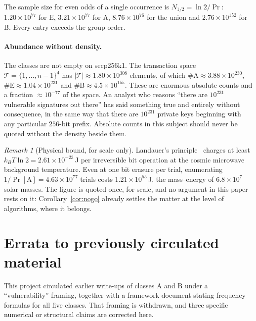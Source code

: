\documentclass[11pt,a4paper]{article}
\theoremstyle{plain}
\theoremstyle{definition}
\theoremstyle{remark}
\newtheorem{remark}[theorem]{Remark}
\newcommand{\Pro}{\Pr}
\newcommand{\clA}{\mathrm{A}}
\newcommand{\clB}{\mathrm{B}}
\newcommand{\clE}{\mathrm{E}}
\begin{document}
The sample size for even odds of a single occurrence is $N_{1/2} = \ln 2/\Pro$: $1.20\times10^{77}$
for $\clE$, $3.21\times10^{77}$ for $\clA$, $8.76\times10^{76}$ for the union and
$2.76\times10^{152}$ for $\clB$. Every entry exceeds the group order.

\paragraph{Abundance without density.}
The classes are not empty on secp256k1. The transaction space
$\mathcal{T} = \{1,\dots,n-1\}^{4}$ has $|\mathcal{T}| \approx 1.80\times10^{308}$ elements, of
which $\#\clA \approx 3.88\times10^{230}$, $\#\clE \approx 1.04\times10^{231}$ and
$\#\clB \approx 4.5\times10^{155}$. These are enormous absolute counts and a fraction
$\approx 10^{-77}$ of the space. An analyst who reasons ``there are $10^{231}$ vulnerable
signatures out there'' has said something true and entirely without consequence, in the same way
that there are $10^{231}$ private keys beginning with any particular $256$-bit prefix. Absolute
counts in this subject should never be quoted without the density beside them.

\begin{remark}[Physical bound, for scale only]
Landauer's principle~\cite{landauer1961} charges at least $k_BT\ln 2 = 2.61\times10^{-23}\,$J per
irreversible bit operation at the cosmic microwave background temperature. Even at one bit erasure
per trial, enumerating $1/\Pro[\clA] = 4.63\times10^{77}$ trials costs $1.21\times10^{55}\,$J, the
mass--energy of $6.8\times10^{7}$ solar masses. The figure is quoted once, for scale, and no
argument in this paper rests on it: Corollary~\ref{cor:nogo} already settles the matter at the
level of algorithms, where it belongs.
\end{remark}

\section{Errata to previously circulated material}\label{sec:errata}

This project circulated earlier write-ups of classes $\clA$ and $\clB$ under a ``vulnerability''
framing, together with a framework document stating frequency formulas for all five classes. That
framing is withdrawn, and three specific numerical or structural claims are corrected here.
\end{document}
